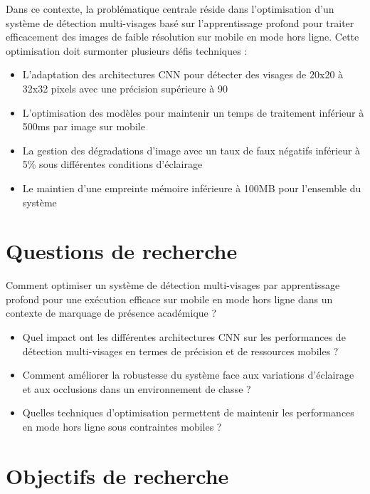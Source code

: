 \begin{onehalfspace}
\hspace{0.65 cm}Dans ce contexte, la problématique centrale réside dans l'optimisation d'un système de détection multi-visages basé sur l'apprentissage profond pour traiter efficacement des images de faible résolution sur mobile en mode hors ligne. Cette optimisation doit surmonter plusieurs défis techniques :
\begin{itemize}
     \item L'adaptation des architectures CNN pour détecter des visages de 20x20 à 32x32 pixels avec une précision supérieure à 90%
     \item L'optimisation des modèles pour maintenir un temps de traitement inférieur à 500ms par image sur mobile
     \item La gestion des dégradations d'image avec un taux de faux négatifs inférieur à 5\% sous différentes conditions d'éclairage
     \item Le maintien d'une empreinte mémoire inférieure à 100MB pour l'ensemble du système
     
\end{itemize}


\section{Questions de recherche}

\hspace{0.65 cm} Comment optimiser un système de détection multi-visages par apprentissage profond pour une exécution efficace sur mobile en mode hors ligne dans un contexte de marquage de présence académique ?

\begin{itemize}
     \item Quel impact ont les différentes architectures CNN sur les performances de détection multi-visages en termes de précision et de ressources mobiles ?
     \item Comment améliorer la robustesse du système face aux variations d'éclairage et aux occlusions dans un environnement de classe ?
     \item Quelles techniques d'optimisation permettent de maintenir les performances en mode hors ligne sous contraintes mobiles ?
     
\end{itemize}

\section{Objectifs de recherche}


\end{onehalfspace}
